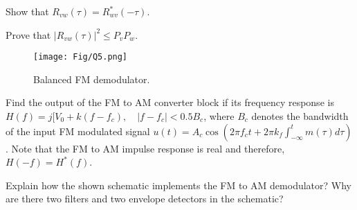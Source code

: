\documentclass[fleqn]{article}
\begin{document}
\begin{question}

\begin{subquestion}{Show that $R_{vw}(\tau)=R^*_{wv}(-\tau)$.
} 
\end{subquestion}

\begin{subquestion}{Prove that $|R_{vw}(\tau)|^2 \leqslant P_v P_w$.
} 
\answer{}
\end{subquestion}
\end{question}


\begin{question}

\begin{figure}[h]
\centering
\texttt{[image: Fig/Q5.png]}
\caption{Balanced FM demodulator.}\label{fig:Q5}
\end{figure}
\begin{subquestion}{Find the output of the FM to AM converter block if its frequency response is $H(f)=j[V_0+k(f-f_c), \quad |f-f_c|<0.5B_c$, where $B_c$ denotes the bandwidth of the input FM modulated signal $u(t)=A_c\cos(2\pi f_c t +2\pi k_f \int_{-\infty}^t m(\tau)d\tau)$. Note that the FM to AM impulse response is real and therefore, $H(-f)=H^*(f)$.
} 
\answer{

}
\end{subquestion}

\begin{subquestion}{Explain how the shown schematic implements the FM to AM demodulator? Why are there two filters and two envelope detectors in the schematic?
} 
\answer{}
\end{subquestion}

\end{question}
\end{document}

